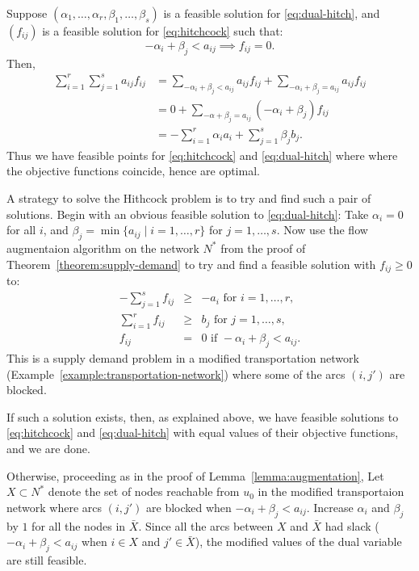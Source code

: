 \documentclass{amsbook}
\theoremstyle{definition}
\theoremstyle{remark}
\begin{document}
Suppose $(\alpha_1,\dotsc,\alpha_r,\beta_1,\dotsc,\beta_s)$ is a feasible solution for \eqref{eq:dual-hitch}, and $(f_{ij})$ is a feasible solution for \eqref{eq:hitchcock} such that:
\begin{equation}
  \label{eq:tight}
  -\alpha_i + \beta_j < a_{ij} \implies f_{ij}=0.
\end{equation}
Then,
\begin{align*}
  \sum_{i=1}^r \sum_{j=1}^s a_{ij}f_{ij} & = \sum_{-\alpha_i+\beta_j<a_{ij}} a_{ij}f_{ij} + \sum_{-\alpha_i+\beta_j=a_{ij}} a_{ij}f_{ij}\\
                                         & = 0 + \sum_{-\alpha+\beta_j=a_{ij}} (-\alpha_i+\beta_j)f_{ij}\\
  & = -\sum_{i=1}^r \alpha_i a_i + \sum_{j=1}^s \beta_jb_j.
\end{align*}
Thus we have feasible points for \eqref{eq:hitchcock} and \eqref{eq:dual-hitch} where where the objective functions coincide, hence are optimal.

A strategy to solve the Hithcock problem is to try and find such a pair of solutions.
Begin with an obvious feasible solution to \eqref{eq:dual-hitch}: Take $\alpha_i=0$ for all $i$, and $\beta_j = \min\{a_{ij}\mid i=1,\dotsc,r\}$ for $j=1,\dotsc,s$.
Now use the flow augmentaion algorithm on the network $N^*$  from the proof of Theorem~\ref{theorem:supply-demand} to try and find a feasible solution with $f_{ij}\geq 0$ to:
\begin{equation}
  \label{eq:2}
  \begin{array}{rcl}
    -\sum_{j=1}^s f_{ij} & \geq & - a_i \text{ for }i=1,\dotsc,r,\\
    \sum_{i=1}^r f_{ij} & \geq & b_j \text{ for }j=1,\dotsc,s,\\
    f_{ij} & = & 0 \text{ if } -\alpha_i+\beta_j < a_{ij}.
  \end{array}
\end{equation}
This is a supply demand problem in a modified transportation network (Example~\ref{example:transportation-network}) where some of the arcs $(i,j')$ are blocked.

If such a solution exists, then, as explained above, we have feasible solutions to \eqref{eq:hitchcock} and \eqref{eq:dual-hitch} with equal values of their objective functions, and we are done.

Otherwise, proceeding as in the proof of Lemma~\ref{lemma:augmentation}, Let $X\subset N^*$ denote the set of nodes reachable from $u_0$ in the modified transportaion network where arcs $(i,j')$ are blocked when $-\alpha_i+\beta_j<a_{ij}$.
Increase $\alpha_i$ and $\beta_j$ by $1$ for all the nodes in $\bar X$.
Since all the arcs between $X$ and $\bar X$ had slack ($-\alpha_i+\beta_j<a_{ij}$ when $i\in X$ and $j'\in \bar X$), the modified values of the dual variable are still feasible.
\end{document}
